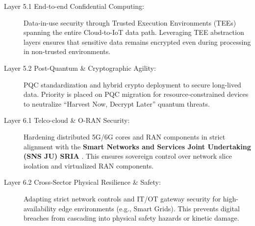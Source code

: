 \documentclass[12pt,a4paper]{article}
\begin{document}
\begin{description}
\item[Layer 5.1 End-to-end Confidential Computing:] Data-in-use security through Trusted Execution Environments (TEEs) spanning the entire Cloud-to-IoT data path. Leveraging TEE abstraction layers ensures that sensitive data remains encrypted even during processing in non-trusted environments.

\item[Layer 5.2 Post-Quantum \& Cryptographic Agility:] PQC standardization and hybrid crypto deployment to secure long-lived data. Priority is placed on PQC migration for resource-constrained devices to neutralize ``Harvest Now, Decrypt Later'' quantum threats.

\item[Layer 6.1 Telco-cloud \& O-RAN Security:] Hardening distributed 5G/6G cores and RAN components in strict alignment with the \textbf{Smart Networks and Services Joint Undertaking (SNS JU) SRIA} \cite{snsju}. This ensures sovereign control over network slice isolation and virtualized RAN components.

\item[Layer 6.2 Cross-Sector Physical Resilience \& Safety:] Adapting strict network controls and IT/OT gateway security for high-availability edge environments (e.g., Smart Grids). This prevents digital breaches from cascading into physical safety hazards or kinetic damage.

\end{description}
\end{document}
